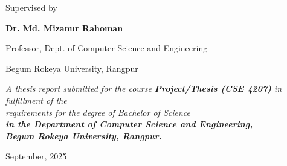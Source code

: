 \begin{titlepage}
        Supervised by\par
        \textbf{Dr. Md. Mizanur Rahoman}\par
        Professor, Dept. of Computer Science and Engineering\par
        Begum Rokeya University, Rangpur\par

        \vspace{1cm}

\textit{A thesis report submitted for the course \textbf{Project/Thesis (CSE 4207)} in fulfillment of the\\
requirements for the degree of Bachelor of Science\\
\textbf{in the Department of Computer Science and Engineering,\\ Begum Rokeya University, Rangpur.}}

\vspace{1cm}
        { \large
            September, 2025
        }
\end{titlepage}
\vspace{10mm}
  

\newpage